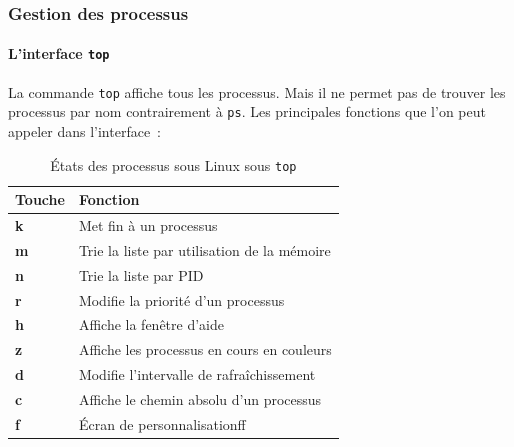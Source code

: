 \documentclass{beamer}
\begin{document}
    \begin{frame}
        \transdissolve
        \frametitle{Gestion des processus}
        \framesubtitle{L'interface \lstinline{top}}
        La commande \lstinline{top} affiche tous les processus.
        Mais il ne permet pas de trouver les processus par nom contrairement à \lstinline{ps}.
        \bigbreak
        Les principales fonctions que l'on peut appeler dans l'interface~:
        \begin{table}[h!]
            \centering
            \begin{tabular}{|p{}|p{}|}
                \hline
                \textbf{Touche} & \textbf{Fonction}                           \\ \hline
                \textbf{k}      & Met fin à un processus                      \\ \hline
                \textbf{m}      & Trie la liste par utilisation de la mémoire \\ \hline
                \textbf{n}      & Trie la liste par PID                       \\ \hline
                \textbf{r}      & Modifie la priorité d’un processus          \\ \hline
                \textbf{h}      & Affiche la fenêtre d’aide                   \\ \hline
                \textbf{z}      & Affiche les processus en cours en couleurs  \\ \hline
                \textbf{d}      & Modifie l’intervalle de rafraîchissement    \\ \hline
                \textbf{c}      & Affiche le chemin absolu d’un processus     \\ \hline
                \textbf{f}      & Écran de personnalisationff                 \\ \hline
            \end{tabular}
            \caption{États des processus sous Linux sous \lstinline{top}}
        \end{table}
    \end{frame}
\end{document}
